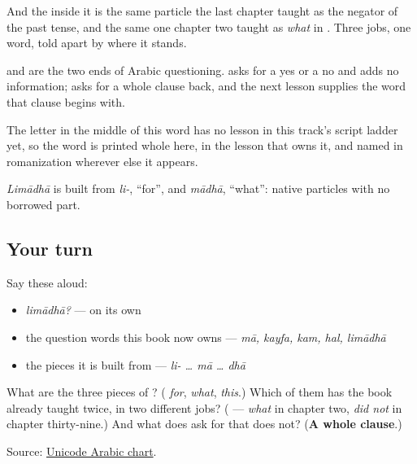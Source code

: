 And the \textbf{} inside it is the same particle the last chapter taught as the negator of the past tense, and the same one chapter two taught as \emph{what} in \textbf{ }. Three jobs, one word, told apart by where it stands.

\begin{cousinweb}
\textbf{} and \textbf{} are the two ends of Arabic questioning. \textbf{} asks for a yes or a no and adds no information; \textbf{} asks for a whole clause back, and the next lesson supplies the word that clause begins with.

The letter \textbf{} in the middle of this word has no lesson in this track's script ladder yet, so the word is printed whole here, in the lesson that owns it, and named in romanization wherever else it appears.

\emph{Limādhā} is built from \emph{li-}, \textquotedblleft{}for\textquotedblright{}, and \emph{mādhā}, \textquotedblleft{}what\textquotedblright{}: native particles with no borrowed part.
\end{cousinweb}

\subsection*{Your turn}
Say these aloud:

\begin{itemize}
\raggedright
  \item \emph{limādhā?} — on its own
  \item the question words this book now owns — \emph{mā, kayfa, kam, hal, limādhā}
  \item the pieces it is built from — \emph{li- … mā … dhā}
\end{itemize}

\begin{tcolorbox}[breakable,colback=teal!4,colframe=teal!35!black,title={Before you move on}]
What are the three pieces of \textbf{}? (\textbf{} \emph{for}, \textbf{} \emph{what}, \textbf{} \emph{this}.) Which of them has the book already taught twice, in two different jobs? (\textbf{} — \emph{what} in chapter two, \emph{did not} in chapter thirty-nine.) And what does \textbf{} ask for that \textbf{} does not? (\textbf{A whole clause}.)

Source: \href{https://www.unicode.org/charts/PDF/U0600.pdf}{Unicode Arabic chart}.
\end{tcolorbox}
